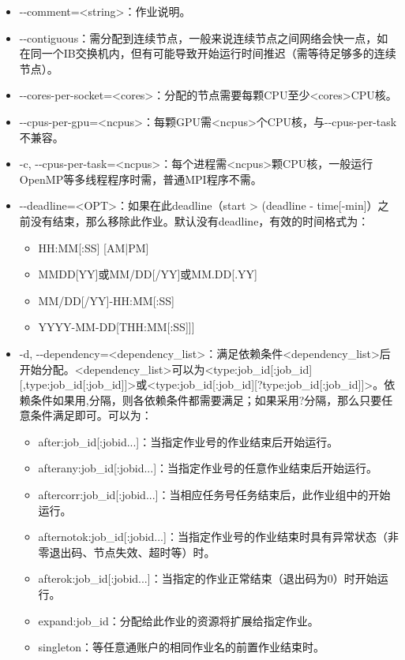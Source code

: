 \begin{itemize}
	\item -{}-comment=<string>：作业说明。
	\item -{}-contiguous：需分配到连续节点，一般来说连续节点之间网络会快一点，如在同一个IB交换机内，但有可能导致开始运行时间推迟（需等待足够多的连续节点）。
    \item -{}-cores-per-socket=<cores>：分配的节点需要每颗CPU至少<cores>CPU核。
	\item -{}-cpus-per-gpu=<ncpus>：每颗GPU需<ncpus>个CPU核，与-{}-cpus-per-task不兼容。
	\item -c, -{}-cpus-per-task=<ncpus>：每个进程需<ncpus>颗CPU核，一般运行OpenMP等多线程程序时需，普通MPI程序不需。
    \item -{}-deadline=<OPT>：如果在此deadline（start > (deadline - time[-min]）之前没有结束，那么移除此作业。默认没有deadline，有效的时间格式为：
	\begin{itemize}
		\item HH:MM[:SS] [AM|PM]
		\item MMDD[YY]或MM/DD[/YY]或MM.DD[.YY]
		\item MM/DD[/YY]-HH:MM[:SS]
		\item YYYY-MM-DD[THH:MM[:SS]]]
	\end{itemize}
    \item -d, -{}-dependency=<dependency\_list>：满足依赖条件<dependency\_list>后开始分配。<dependency\_list>可以为<type:job\_id[:job\_id][,type:job\_id[:job\_id]]>或<type:job\_id[:job\_id][?type:job\_id[:job\_id]]>。依赖条件如果用,分隔，则各依赖条件都需要满足；如果采用?分隔，那么只要任意条件满足即可。可以为：
	\begin{itemize}
		\item after:job\_id[:jobid...]：当指定作业号的作业结束后开始运行。
		\item afterany:job\_id[:jobid...]：当指定作业号的任意作业结束后开始运行。
		\item aftercorr:job\_id[:jobid...]：当相应任务号任务结束后，此作业组中的开始运行。
		\item afternotok:job\_id[:jobid...]：当指定作业号的作业结束时具有异常状态（非零退出码、节点失效、超时等）时。
		\item afterok:job\_id[:jobid...]：当指定的作业正常结束（退出码为0）时开始运行。
		\item expand:job\_id：分配给此作业的资源将扩展给指定作业。
		\item singleton：等任意通账户的相同作业名的前置作业结束时。

\end{itemize}
\end{itemize}
